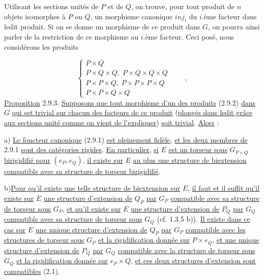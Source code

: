 Utilisant les sections unités de $P$ et de $Q$, on trouve, pour tout produit de $n$ objets isomorphes à $P$ ou $Q$, un morphisme canonique $inj_i$ du $i$.ème facteur dans ledit produit. Si on se donne un morphisme de ce produit dans $G$, on pourra ainsi parler de la restriction de ce morphisme au $i$.ème facteur. Ceci posé, nous considérons les produits

\begin{equation}\tag{2.9.2}
\left\{ \begin{array}{l} P\times Q \\[2mm] P\times Q\times Q, \; P\times Q\times Q\times Q \\[2mm] P\times P\times Q, \; P\times P\times P\times Q \\[2mm] P\times P\times Q\times Q \end{array} \right. \qquad ,
\end{equation}
\underline{Proposition} 2.9.3. \underline{Supposons que tout morphisme d'un des produits} (2.9.2) \underline{dans} $G$ \underline{qui est trivial sur chacun des facteurs de ce produit} (\underline{plongés dans ledit grâce aux sections unité comme on vient de l'expliquer}) \underline{soit trivial}. \underline{Alors} :

a)  \underline{Le foncteur canonique} (2.9.1) \underline{est pleinement fidèle}, \underline{et les deux membres de} 2.9.1 \underline{sont des catégories rigides}. \underline{En particulier}, \underline{si} $E$ \underline{est un torseur sous} $G_{P\times Q}$ \underline{birigidifié pour} $(e_P,e_Q)$, \underline{il existe sur} $E$ \underline{au plus une structure de biextension compatible avec sa structure de torseur birigidifié}.



b)\quad \underline{Pour qu'il existe une telle structure de biextension sur} $E$, \underline{il faut et il suffit qu'il existe sur} $E$ \underline{une structure d'extension de} $Q_P$ \underline{par} $G_P$ \underline{compatible avec sa structure de torseur sous} $G_P$, \underline{et qu'il existe sur} $E$ \underline{une structure d'extension de} $P_Q$ \underline{par} $G_Q$ \underline{compatible avec sa structure de torseur sous} $G_Q$ (cf. 1.3.5 b)). \underline{Il existe dans ce cas sur} $E$ \underline{une unique structure d'extension de} $Q_P$ \underline{par} $G_P$ \underline{compatible avec les structures de torseur sous} $G_P$ \underline{et la rigidification donnée sur} $P\times e_Q$, \underline{et une unique structure d'extension de} $P_Q$ \underline{par} $G_Q$ \underline{compatible avec la structure de torseur sous} $G_Q$ \underline{et la rigidification  donnée sur} $e_P\times Q$, \underline{et ces deux structures d'extension sont compatibles} (2.1).

